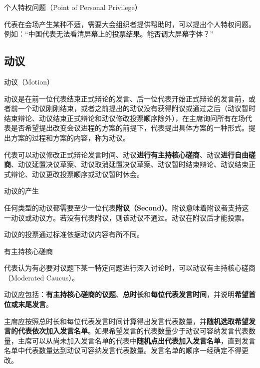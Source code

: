 \documentclass{beamer}
\begin{document}
\begin{frame}{个人特权问题（Point of Personal Privilege）}

代表在会场产生某种不适，需要大会组织者提供帮助时，可以提出个人特权问题。例如：“中国代表无法看清屏幕上的投票结果。能否调大屏幕字体？”

\end{frame}

\subsection{动议}

\begin{frame}{动议（Motion）}

动议是\tiny{在前一位代表结束正式辩论的发言、后一位代表开始正式辩论的发言前，或者前一个动议刚刚结束，或者之前提出的动议没有获得附议或通过之后（动议暂时结束辩论、动议结束正式辩论和动议修改投票顺序除外），在主席询问所有在场代表是否希望提出改变会议进程的方案的前提下，}\normalsize{代表提出具体方案的一种形式。提出方案的过程和方案的内容，称为动议。}

代表可以动议修改正式辩论发言时间、动议\textbf{进行有主持核心磋商}、动议\textbf{进行自由磋商}、动议延置决议草案、动议取消延置决议草案、动议暂时结束辩论、动议结束正式辩论、动议更改投票顺序或动议暂时休会。

\end{frame}

\begin{frame}{动议的产生}

任何类型的动议都需要至少一位代表\textbf{附议（Second）}。附议意味着附议者支持这一动议或动议方。若没有代表附议，则该动议不通过。动议在附议后才能投票。

动议的投票通过标准依据动议内容有所不同。

\end{frame}

\begin{frame}{有主持核心磋商}

代表认为有必要对议题下某一特定问题进行深入讨论时，可以动议有主持核心磋商（Moderated Caucus）。

动议应包括：\textbf{有主持核心磋商的议题}、\textbf{总时长}和\textbf{每位代表发言时间}，并说明\textbf{希望首位或末尾发言}。

主席应按照总时长和每位代表发言时间计算得出发言代表数量，并\textbf{随机选取希望发言的代表依次加入发言名单}。如果希望发言的代表数量少于动议可容纳发言代表数量，主席可以从尚未加入发言名单的代表中\textbf{随机点出代表加入发言名单}，直到发言名单中代表数量达到动议可容纳发言代表数量。发言名单的顺序一经确定不得更改。

\end{frame}
\end{document}
